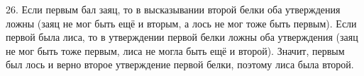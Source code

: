 26. Если первым бал заяц, то в высказывании второй белки оба утверждения ложны (заяц не мог быть ещё и вторым, а лось не мог тоже быть первым). Если первой была лиса, то в утверждении первой белки ложны оба утверждения (заяц не мог быть тоже первым, лиса не могла быть ещё и второй). Значит, первым был лось и верно второе утверждение первой белки, поэтому лиса была второй.\\
